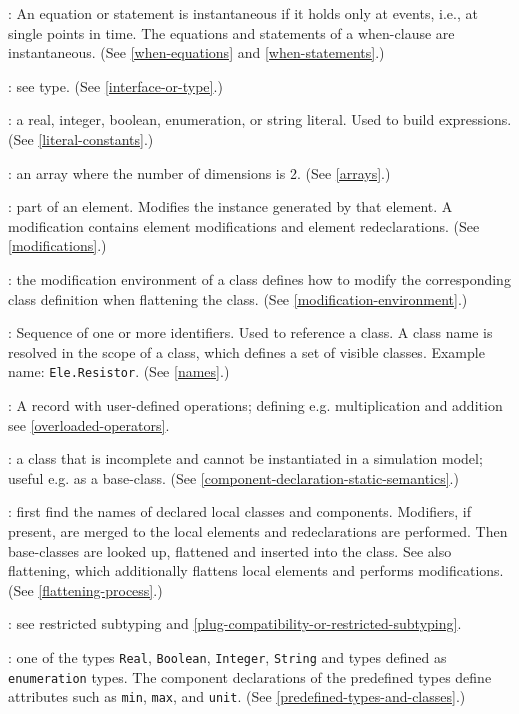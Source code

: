 : An equation or statement is instantaneous if it
holds only at events, i.e., at single points in time. The equations and
statements of a when-clause are instantaneous. (See \autoref{when-equations} and
\autoref{when-statements}.)

: see type. (See \autoref{interface-or-type}.)

: a real, integer, boolean, enumeration, or string
literal. Used to build expressions. (See \autoref{literal-constants}.)

: an array where the number of dimensions is 2. (See
\autoref{arrays}.)

: part of an element. Modifies the instance
generated by that element. A modification contains element modifications
and element redeclarations. (See \autoref{modifications}.)

: the modification environment of a
class defines how to modify the corresponding class definition when
flattening the class. (See \autoref{modification-environment}.)

: Sequence of one or more identifiers. Used to reference a
class. A class name is resolved in the scope of a class, which defines a
set of visible classes. Example name: \lstinline!Ele.Resistor!. (See \autoref{names}.)

: A record with user-defined operations;
defining e.g. multiplication and addition see \autoref{overloaded-operators}.

: a class that is incomplete and cannot be instantiated
in a simulation model; useful e.g. as a base-class. (See \autoref{component-declaration-static-semantics}.)

: first find the names of declared local
classes and components. Modifiers, if present, are merged to the local
elements and redeclarations are performed. Then base-classes are looked
up, flattened and inserted into the class. See also flattening, which
additionally flattens local elements and performs modifications. (See
\autoref{flattening-process}.)

: see restricted subtyping and \autoref{plug-compatibility-or-restricted-subtyping}.

: one of the types \lstinline!Real!, \lstinline!Boolean!, \lstinline!Integer!,
\lstinline!String! and types defined as \lstinline!enumeration! types. The component
declarations of the predefined types define attributes such as \lstinline!min!, \lstinline!max!,
and \lstinline!unit!. (See \autoref{predefined-types-and-classes}.)

